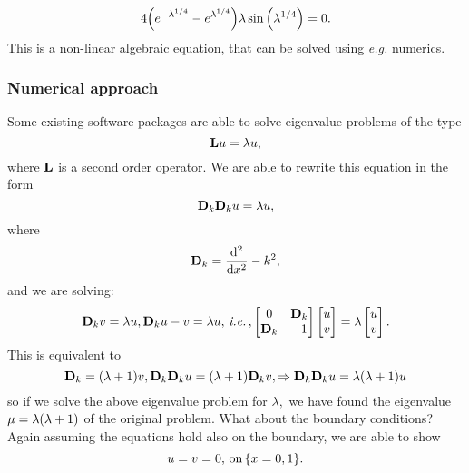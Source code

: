 \documentclass[reqno, a4paper]{article}
\begin{document}
\[
	4\qty(e^{-\lambda^{1/4}}-e^{\lambda^{1/4}})\lambda \sin\qty(\lambda^{1/4}) = 0.
\]
This is a non-linear algebraic equation, that can be solved using \textit{e.g.} numerics.

\subsubsection{Numerical approach}
\label{sec:numerical_approach}

Some existing software packages are able to solve eigenvalue problems of the type
\[
	\vb{L}u = \lambda u,
\]
where $\vb{L}$ is a second order operator. We are able to rewrite this equation in the form
\[
	\vb{D}_k \vb{D}_k u = \lambda u,
\]
where
\[
	\vb{D}_k = \dv[2]{x}-k^{2},
\]
and we are solving:
\[
	\vb{D}_k v = \lambda u, \vb{D}_k u - v = \lambda u, \, \text{\textit{i.e.}} \,, \begin{bmatrix}
		0 & \vb{D}_k \\
		\vb{D}_k & -1
	\end{bmatrix} \begin{bmatrix}
		u \\
		v
	\end{bmatrix}
	= \lambda \begin{bmatrix}
		u \\
		v
	\end{bmatrix}.
\]
This is equivalent to
\[
	\vb{D}_k = \qty(\lambda+1)v, \vb{D}_k \vb{D}_k u = \qty(\lambda+1)\vb{D}_k v, \Rightarrow \vb{D}_k \vb{D}_k u = \lambda \qty(\lambda +1) u
\]
so if we solve the above eigenvalue problem for $\lambda,$ we have found the eigenvalue $\mu = \lambda \qty(\lambda +1)$ of the original problem. What about the boundary conditions? Again assuming the equations hold also on the boundary, we are able to show
\[
	u = v = 0, \, \text{on} \, \qty{x = 0,1}.
\]
\end{document}
